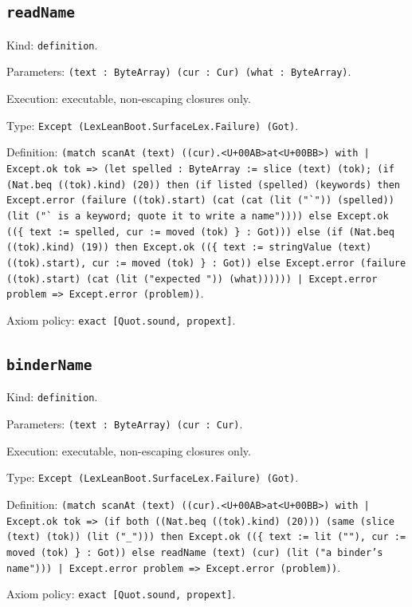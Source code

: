 \documentclass[11pt]{article}
\begin{document}
\subsection*{\texttt{readName}}
\noindent Kind: \texttt{definition}.\par
\noindent Parameters: \texttt{(text : ByteArray) (cur : Cur) (what : ByteArray)}.\par
\noindent Execution: executable, non-escaping closures only.\par
\noindent Type: \texttt{Except (LexLeanBoot.SurfaceLex.Failure) (Got)}.\par
\noindent Definition: \texttt{(match scanAt (text) ((cur).<U+00AB>at<U+00BB>) with | Except.ok tok => (let spelled : ByteArray := slice (text) (tok); (if (Nat.beq ((tok).kind) (20)) then (if listed (spelled) (keywords) then Except.error (failure ((tok).start) (cat (cat (lit ("`")) (spelled)) (lit ("` is a keyword; quote it to write a name")))) else Except.ok ((\{ text := spelled, cur := moved (tok) \} : Got))) else (if (Nat.beq ((tok).kind) (19)) then Except.ok ((\{ text := stringValue (text) ((tok).start), cur := moved (tok) \} : Got)) else Except.error (failure ((tok).start) (cat (lit ("expected ")) (what)))))) | Except.error problem => Except.error (problem))}.\par
\noindent Axiom policy: \texttt{exact [Quot.sound, propext]}.\par
\subsection*{\texttt{binderName}}
\noindent Kind: \texttt{definition}.\par
\noindent Parameters: \texttt{(text : ByteArray) (cur : Cur)}.\par
\noindent Execution: executable, non-escaping closures only.\par
\noindent Type: \texttt{Except (LexLeanBoot.SurfaceLex.Failure) (Got)}.\par
\noindent Definition: \texttt{(match scanAt (text) ((cur).<U+00AB>at<U+00BB>) with | Except.ok tok => (if both ((Nat.beq ((tok).kind) (20))) (same (slice (text) (tok)) (lit ("\_"))) then Except.ok ((\{ text := lit (""), cur := moved (tok) \} : Got)) else readName (text) (cur) (lit ("a binder's name"))) | Except.error problem => Except.error (problem))}.\par
\noindent Axiom policy: \texttt{exact [Quot.sound, propext]}.\par
\end{document}
